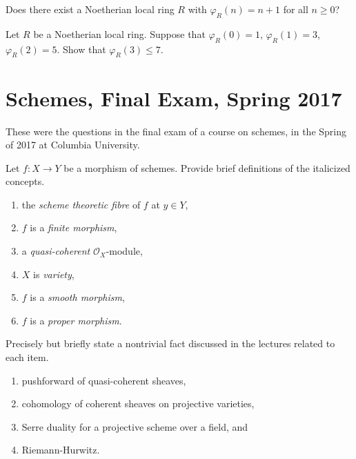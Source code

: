 \begin{exercise}
\label{exercise-hilbert-function-allowed}
Does there exist a Noetherian local ring $R$ with
$\varphi_R(n) = n + 1$ for all $n \geq 0$?
\end{exercise}

\begin{exercise}
\label{exercise-hilbert-function-prohibited}
Let $R$ be a Noetherian local ring.
Suppose that $\varphi_R(0) = 1$, $\varphi_R(1) = 3$,
$\varphi_R(2) = 5$. Show that $\varphi_R(3) \leq 7$.
\end{exercise}





\section{Schemes, Final Exam, Spring 2017}
\label{section-final-exam-spring-2017}

\noindent
These were the questions in the final exam of a course on schemes,
in the Spring of 2017 at Columbia University.

\begin{exercise}[Definitions]
\label{exercise-definitions-spring-2017}
Let $f : X \to Y$ be a morphism of schemes.
Provide brief definitions of the italicized concepts.
\begin{enumerate}
\item the {\it scheme theoretic fibre} of $f$ at $y \in Y$,
\item $f$ is a {\it finite morphism},
\item a {\it quasi-coherent} $\mathcal{O}_X$-module,
\item $X$ is {\it variety},
\item $f$ is a {\it smooth morphism},
\item $f$ is a {\it proper morphism}.
\end{enumerate}
\end{exercise}

\begin{exercise}[Theorems]
\label{exercise-results-spring-2017}
Precisely but briefly state a nontrivial fact discussed in the lectures
related to each item.
\begin{enumerate}
\item pushforward of quasi-coherent sheaves,
\item cohomology of coherent sheaves on projective varieties,
\item Serre duality for a projective scheme over a field, and
\item Riemann-Hurwitz.
\end{enumerate}
\end{exercise}


